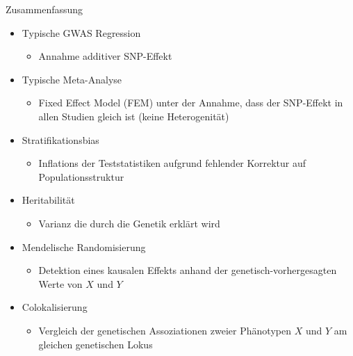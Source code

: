 \documentclass{beamer}
\begin{document}
\begin{frame}{Zusammenfassung}

\begin{itemize}
    \item Typische GWAS Regression
    \begin{itemize}
        \item Annahme additiver SNP-Effekt
    \end{itemize}
    \item Typische Meta-Analyse
    \begin{itemize}
        \item Fixed Effect Model (FEM) unter der Annahme, dass der SNP-Effekt in allen Studien gleich ist (keine Heterogenität)
    \end{itemize}
    \item Stratifikationsbias
    \begin{itemize}
        \item Inflations der Teststatistiken aufgrund fehlender Korrektur auf Populationsstruktur
    \end{itemize}
    \item Heritabilität
    \begin{itemize}
        \item Varianz die durch die Genetik erklärt wird
    \end{itemize}
    \item Mendelische Randomisierung
    \begin{itemize}
        \item Detektion eines kausalen Effekts anhand der genetisch-vorhergesagten Werte von $X$ und $Y$
    \end{itemize}
    \item Colokalisierung
    \begin{itemize}
        \item Vergleich der genetischen Assoziationen zweier Phänotypen $X$ und $Y$ am gleichen genetischen Lokus
    \end{itemize}   
\end{itemize}
    
\end{frame}
\end{document}
